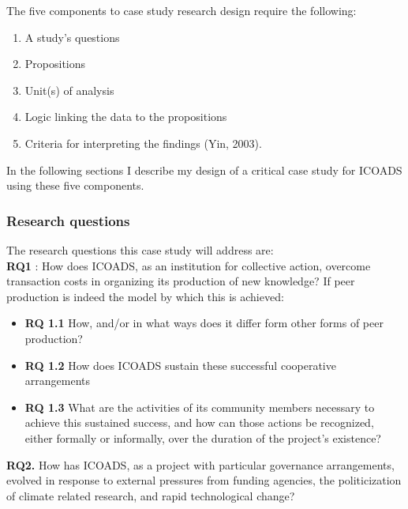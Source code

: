\documentclass[thesis,tocnosub,noragright,centerchapter,12pt]{uiucecethesis09}
\begin{document}
{The five components to case study research design require the following:

\begin{enumerate}
\def\labelenumi{\arabic{enumi}.}
\itemsep1pt\parskip0pt
\item
  A study's questions
\item
  Propositions
\item
  Unit(s) of analysis
\item
  Logic linking the data to the propositions
\item
  Criteria for interpreting the findings (Yin, 2003). 
\end{enumerate}

In the following sections I describe my design of a critical case study
for ICOADS using these five components.

\subsubsection*{Research questions}

The research questions this case study will address are:\\
\textbf{RQ1} : How does ICOADS, as an institution for collective action,
overcome transaction costs in organizing its production of new
knowledge? If peer production is indeed the model by which this is
achieved:

\begin{itemize}
\item[]
  \textbf{RQ 1.1} How, and/or in what ways does it differ form other forms of
  peer production?
\item[]
  \textbf{RQ 1.2} How does ICOADS sustain these successful cooperative
  arrangements
\item[]
  \textbf{RQ 1.3} What are the activities of its community members necessary to
  achieve this sustained success, and how can those actions be
  recognized, either formally or informally, over the duration of the
  project's existence?
\end{itemize}

\textbf{RQ2.} How has ICOADS, as a project with particular governance
arrangements, evolved in response to external pressures from funding
agencies, the politicization of climate related research, and rapid
technological change?\\

}
\end{document}
